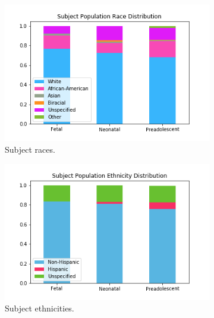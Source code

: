 \begin{figure}
\centering
  \begin{subfigure}{.45\textwidth}
    \centering
    \includegraphics[width=1.0\textwidth]{5/demo_clinical_subj_race.png}
    \caption{Subject races.}
    \label{ch5:clinical:race}
  \end{subfigure}%
  \hspace{0.05\textwidth}
  \begin{subfigure}{0.45\textwidth}
    \centering
    \includegraphics[width=1.0\textwidth]{5/demo_clinical_subj_ethnicity.png}
    \caption{Subject ethnicities.}
    \label{ch5:clinical:eth}
  \end{subfigure}
  \begin{subfigure}{0.45\textwidth}
    \centering

\end{subfigure}
\end{figure}
